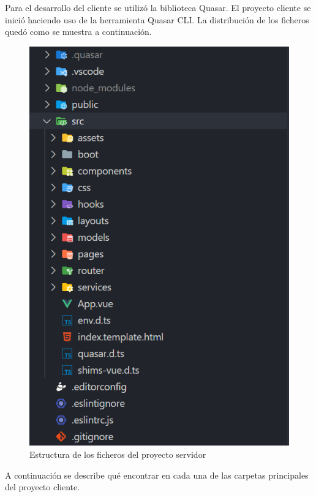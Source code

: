 Para el desarrollo del cliente se utilizó la biblioteca Quasar. El proyecto 
cliente se inició haciendo uso de la herramienta Quasar CLI. 
La distribución de los ficheros quedó como se muestra a continuación.

\begin{figure}[H]
    \includegraphics[scale=0.5]{Graphics/Extensibility/client-structure.png}
    \caption{Estructura de los ficheros del proyecto servidor}
    \label{img-client-structure}
\end{figure}

A continuación se describe qué encontrar en cada una de las carpetas principales del proyecto
cliente.

